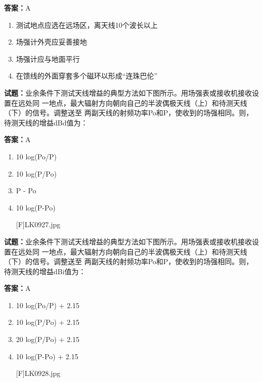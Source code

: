 \documentclass{ctexbook}
\begin{document}
\textbf{答案：}A 


\begin{enumerate}[leftmargin=3em]
  \item 测试地点应选在远场区，离天线10个波长以上 

  \item 场强计外壳应妥善接地 

  \item 场强计应与地面平行 

  \item 在馈线的外面穿套多个磁环以形成“连珠巴伦” 

\end{enumerate}





\vspace{1em}

\textbf{试题：}业余条件下测试天线增益的典型方法如下图所示。用场强表或接收机接收设置在远处同
一地点，最大辐射方向朝向自己的半波偶极天线（上）和待测天线（下）的信号。调整送至
两副天线的射频功率Po和P，使收到的场强相同。则，待测天线的增益dBd值为： 

\textbf{答案：}A 

\begin{enumerate}[leftmargin=3em]
  \item 10 log(Po/P) 

  \item 10 log(P/Po) 

  \item P - Po 

  \item 10 log(P-Po) 

[F]LK0927.jpg 

\end{enumerate}





\vspace{1em}

\textbf{试题：}业余条件下测试天线增益的典型方法如下图所示。用场强表或接收机接收设置在远处同
一地点，最大辐射方向朝向自己的半波偶极天线（上）和待测天线（下）的信号。调整送至
两副天线的射频功率Po和P，使收到的场强相同。则，待测天线的增益dBi值为： 

\textbf{答案：}A 

\begin{enumerate}[leftmargin=3em]
  \item 10 log(Po/P) + 2.15 

  \item 10 log(P/Po) + 2.15 

  \item 20 log(P/Po) + 2.15 

  \item 10 log(P-Po) + 2.15 

[F]LK0928.jpg 

\end{enumerate}
\end{document}
